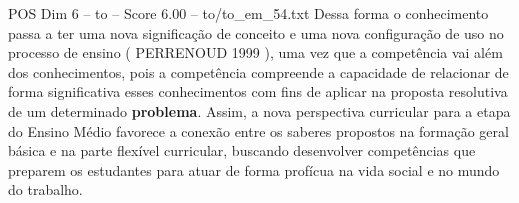 \begin{textsample}{POS Dim 6 – to – Score 6.00 – to/to\_em\_54.txt}
Dessa forma o conhecimento passa a ter uma nova significação de conceito e uma nova configuração de uso no processo de ensino ( PERRENOUD 1999 ), uma vez que a competência vai além dos conhecimentos, pois a competência compreende a capacidade de relacionar de forma significativa esses conhecimentos com fins de aplicar na proposta resolutiva de um determinado \textbf{problema}.
Assim, a nova perspectiva curricular para a etapa do Ensino Médio favorece a conexão entre os saberes propostos na formação geral básica e na parte flexível curricular, buscando desenvolver competências que preparem os estudantes para atuar de forma profícua na vida social e no mundo do trabalho.

\end{textsample}
